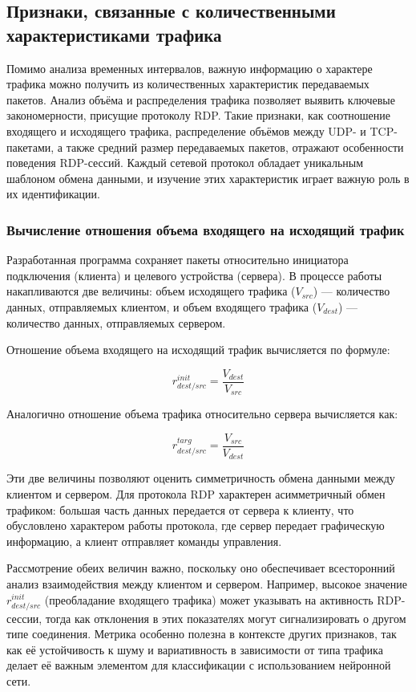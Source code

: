 \documentclass[spec, och, diploma]{SCWorks}
\begin{document}
\subsection{Признаки, связанные с количественными характеристиками трафика}


Помимо анализа временных интервалов, важную информацию о характере трафика можно получить из количественных характеристик передаваемых пакетов.
Анализ объёма и распределения трафика позволяет выявить ключевые закономерности, присущие протоколу RDP. Такие признаки, как соотношение 
входящего и исходящего трафика, распределение объёмов между UDP- и TCP-пакетами, а также средний размер передаваемых пакетов, отражают 
особенности поведения RDP-сессий. Каждый сетевой протокол обладает уникальным шаблоном обмена данными, и изучение этих характеристик 
играет важную роль в их идентификации.

\subsubsection{Вычисление отношения объема входящего на исходящий трафик}

Разработанная программа сохраняет пакеты относительно инициатора подключения (клиента) и целевого устройства (сервера). В процессе работы накапливаются 
две величины: объем исходящего трафика ($V_{src}$) — количество данных, отправляемых клиентом, и объем входящего трафика ($V_{dest}$) — количество данных, 
отправляемых сервером.

Отношение объема входящего на исходящий трафик вычисляется по формуле:

\begin{equation}
  r_{dest/src}^{init} = \frac{V_{dest}}{V_{src}}
\end{equation}

Аналогично отношение объема трафика относительно сервера вычисляется как:

\begin{equation}
  r_{dest/src}^{targ} = \frac{V_{src}}{V_{dest}}
\end{equation}

Эти две величины позволяют оценить симметричность обмена данными между клиентом и сервером. Для протокола RDP характерен асимметричный обмен 
трафиком: большая часть данных передается от сервера к клиенту, что обусловлено характером работы протокола, где сервер передает графическую 
информацию, а клиент отправляет команды управления.

Рассмотрение обеих величин важно, поскольку оно обеспечивает всесторонний анализ взаимодействия между клиентом и сервером. Например, высокое 
значение $r_{dest/src}^{init}$ (преобладание входящего трафика) может указывать на активность RDP-сессии, тогда как отклонения в этих показателях 
могут сигнализировать о другом типе соединения. Метрика особенно полезна в контексте других признаков, так как её устойчивость к шуму и вариативность 
в зависимости от типа трафика делает её важным элементом для классификации с использованием нейронной сети.
\end{document}
